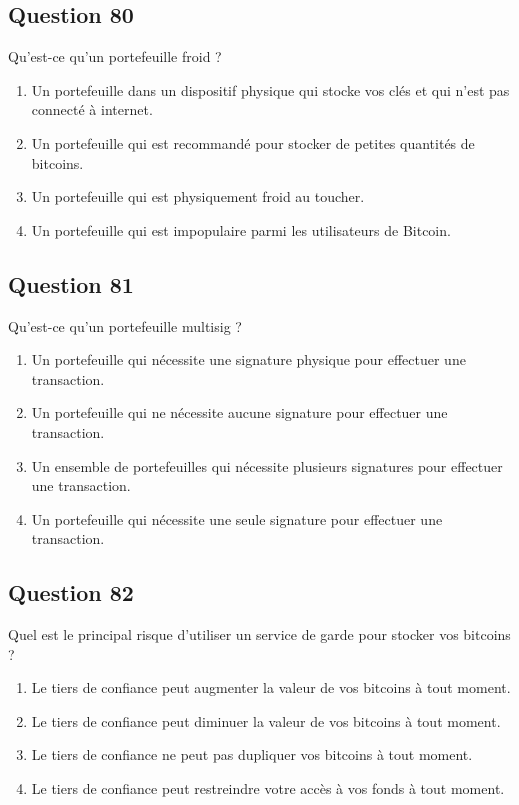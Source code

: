 \documentclass[12pt,a4paper]{article}
\begin{document}
\bigskip


\subsection*{Question 80}
Qu'est-ce qu'un portefeuille froid ?

\begin{enumerate}[label=\Alph*., leftmargin=*]
\item Un portefeuille dans un dispositif physique qui stocke vos clés et qui n'est pas connecté à internet.
\item Un portefeuille qui est recommandé pour stocker de petites quantités de bitcoins.
\item Un portefeuille qui est physiquement froid au toucher.
\item Un portefeuille qui est impopulaire parmi les utilisateurs de Bitcoin.
\end{enumerate}

\bigskip


\subsection*{Question 81}
Qu'est-ce qu'un portefeuille multisig ?

\begin{enumerate}[label=\Alph*., leftmargin=*]
\item Un portefeuille qui nécessite une signature physique pour effectuer une transaction.
\item Un portefeuille qui ne nécessite aucune signature pour effectuer une transaction.
\item Un ensemble de portefeuilles qui nécessite plusieurs signatures pour effectuer une transaction.
\item Un portefeuille qui nécessite une seule signature pour effectuer une transaction.
\end{enumerate}

\bigskip


\subsection*{Question 82}
Quel est le principal risque d'utiliser un service de garde pour stocker vos bitcoins ?

\begin{enumerate}[label=\Alph*., leftmargin=*]
\item Le tiers de confiance peut augmenter la valeur de vos bitcoins à tout moment.
\item Le tiers de confiance peut diminuer la valeur de vos bitcoins à tout moment.
\item Le tiers de confiance ne peut pas dupliquer vos bitcoins à tout moment.
\item Le tiers de confiance peut restreindre votre accès à vos fonds à tout moment.
\end{enumerate}
\end{document}
